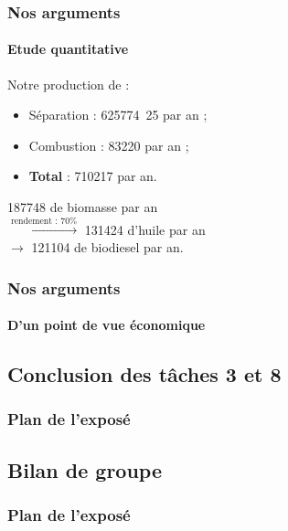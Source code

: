 \documentclass{beamer}
\begin{document}
	\begin{frame}
		\frametitle{Nos arguments}
		\framesubtitle{Etude quantitative}
		Notre production de  :
		\begin{itemize}
			\item Séparation : \unit{625774.25}{\ton} par an ;
			\item Combustion : \unit{83220}{\ton} par an ;
			\item \textbf{Total} : \unit{710217}{\ton} par an.
		\end{itemize}
		\unit{187748}{\kilo\gram\per\hectare} de biomasse par an\\
		$\xrightarrow{\text{rendement : 70\%}}$ \unit{131424}{\kilo\gram\per\hectare} d'huile par an \\
		$\rightarrow$ \unit{121104}{\kilo\gram\per\hectare} de biodiesel par an.
		
	\end{frame}

	\begin{frame}
		\frametitle{Nos arguments}
		\framesubtitle{D'un point de vue économique}
		
	\end{frame}

	\begin{frame}
		\section{Conclusion des tâches 3 et 8}
		\frametitle{Plan de l'exposé}
		\tableofcontents[currentsubsection,sectionstyle=show/shaded,subsectionstyle=show/shaded/hide]
	\end{frame}
	
	\begin{frame}
	        \section{Bilan de groupe}
		\frametitle{Plan de l'exposé}
		\tableofcontents[currentsubsection,sectionstyle=show/shaded,subsectionstyle=show/shaded/hide]
	\end{frame}
	
\end{document}
